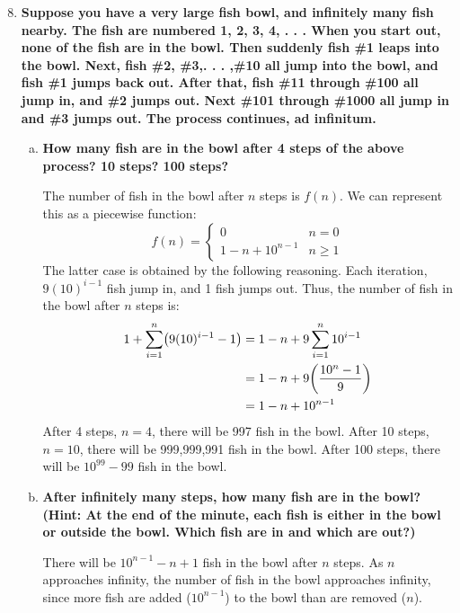 \documentclass[article, 12pt]{article}
\theoremstyle{definition}
\DeclarePairedDelimiter\paren{(}{)} %
\begin{document}
        \begin{enumerate}[(1)]
            \setcounter{enumi}{7}
            \item \textbf{Suppose you have a very large fish bowl, and infinitely many fish nearby. The fish are numbered 1, 2, 3, 4, . . . When you start out, none of the fish are in the bowl. Then suddenly fish \#1 leaps into the bowl. Next, fish \#2, \#3,. . . ,\#10 all jump into the bowl, and fish \#1 jumps back out. After that, fish \#11 through \#100 all jump in, and \#2 jumps out. Next \#101 through \#1000 all jump in and \#3 jumps out. The process continues, ad infinitum.}
            \begin{enumerate}[(a)]
                \item \textbf{How many fish are in the bowl after 4 steps of the above process? 10 steps? 100 steps?}
                
                The number of fish in the bowl after $n$ steps is $f(n)$. We can represent this as a piecewise function:
                \[ f(n) = \begin{cases}
                    0 & n = 0 \\
                    1 - n + 10^{n-1} & n \geq 1
                \end{cases} \]
                The latter case is obtained by the following reasoning. Each iteration, $9(10)^{i-1}$ fish jump in, and 1 fish jumps out. Thus, the number of fish in the bowl after $n$ steps is:
                \begin{align*}
                    1 + \sum_{i=1}^n \paren*{9(10)^{i-1} - 1} &= 1 - n + 9 \sum_{i=1}^n 10^{i-1} \\
                    &= 1 - n + 9 \paren*{\frac{10^n - 1}{9}} \\
                    &= 1 - n + 10^{n-1} 
                \end{align*}
                After 4 steps, $n=4$, there will be 997 fish in the bowl. After 10 steps, $n=10$, there will be 999,999,991 fish in the bowl. After 100 steps, there will be $10^{99} - 99$ fish in the bowl.
                \item \textbf{After infinitely many steps, how many fish are in the bowl? (Hint: At the end of the minute, each fish is either in the bowl or outside the bowl. Which fish are in and which are out?)}
            
                There will be $10^{n-1} - n + 1$ fish in the bowl after $n$ steps. As $n$ approaches infinity, the number of fish in the bowl approaches infinity, since more fish are added ($10^{n-1}$) to the bowl than are removed ($n$).
            \end{enumerate}
    \end{enumerate}
\end{document}
